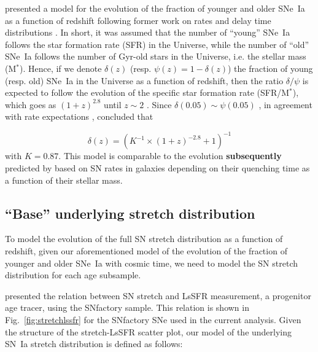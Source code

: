 \documentclass[]{aa}
\begin{document}
\cite{rigault2020} presented a model for the evolution of the fraction of
younger and older SNe~Ia as a function of redshift following former work on
rates and delay time distributions \citep[e.g.,][]{mannucci2005,
scannapieco2005, sullivan2006, aubourg2008, childress2014, maozmannucci2014}.
In short, it was assumed that the number of ``young'' SNe~Ia follows the star
formation rate (SFR) in the Universe, while the number of ``old'' SNe~Ia follows
the number of Gyr-old stars in the Universe, i.e. the stellar mass (M$^*$).
Hence, if we denote $\delta(z)$ (resp. $\psi(z) = 1-\delta(z)$) the fraction of
young (resp. old) SNe~Ia in the Universe as a function of redshift, then the
ratio $\delta/\psi$ is expected to follow the evolution of the specific star
formation rate (SFR/M$^*$), which goes as $(1+z)^{2.8}$ until $z\sim2$
\citep[e.g.,][]{tasca2015}. Since $\delta(0.05) \sim \psi(0.05)$
\citep{rigault2013, rigault2020, wiseman2020}, in agreement with rate
expectations \citep{mannucci2006, rodney2014}, \cite{rigault2020} concluded that

\begin{equation}
    \label{eq:delta}
    \delta(z) = \left( K^{-1} \times (1+z)^{-2.8} +1 \right)^{-1}
\end{equation}
with $K=0.87$. This model is comparable to the evolution \textbf{subsequently}
predicted by \cite{childress2014} based on SN rates in galaxies depending on
their quenching time as a function of their stellar mass.

\subsection{``Base'' underlying stretch distribution}
\label{sec:basemodel}

To model the evolution of the full SN stretch distribution as a function of
redshift, given our aforementioned model of the evolution of the fraction of
younger and older SNe~Ia with cosmic time, we need to model the SN stretch
distribution for each age subsample. 

\cite{rigault2020} presented the relation between SN stretch and LsSFR
measurement, a progenitor age tracer, using the SNfactory sample. This relation
is shown in Fig.~\ref{fig:stretchlssfr} for the SNfactory SNe used in the
current analysis. Given the structure of the stretch-LsSFR scatter plot, our
model of the underlying SN~Ia stretch distribution is defined as follows:
\end{document}
